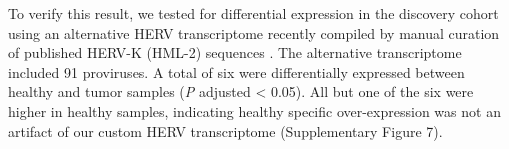 To verify this result, we tested for differential expression in the discovery cohort using an alternative HERV transcriptome recently compiled by manual curation of published HERV-K (HML-2) sequences \citep{Grabski2020}.
The alternative transcriptome included 91 proviruses.
A total of six were differentially expressed between healthy and tumor samples (\emph{P} adjusted < 0.05).
All but one of the six were higher in healthy samples, indicating healthy specific over-expression was not an artifact of our custom HERV transcriptome (Supplementary Figure 7).
